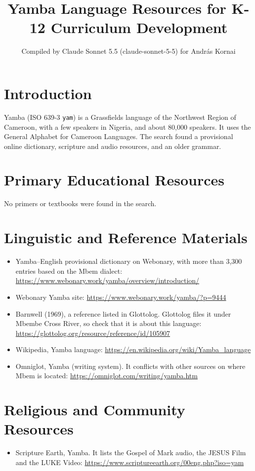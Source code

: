 \documentclass[12pt]{article}
\title{Yamba Language Resources for K-12 Curriculum Development}
\author{Compiled by Claude Sonnet 5.5 (claude-sonnet-5-5) for Andr\'as Kornai}
\date{}
\begin{document}
\maketitle

\section{Introduction}
Yamba (ISO 639-3 \texttt{yam}) is a Grassfields language of the Northwest Region of Cameroon, with a few speakers in Nigeria, and about 80,000 speakers. It uses the General Alphabet for Cameroon Languages. The search found a provisional online dictionary, scripture and audio resources, and an older grammar.

\section{Primary Educational Resources}
No primers or textbooks were found in the search.

\section{Linguistic and Reference Materials}
\begin{itemize}
\item Yamba--English provisional dictionary on Webonary, with more than 3,300 entries based on the Mbem dialect: \url{https://www.webonary.work/yamba/overview/introduction/}
\item Webonary Yamba site: \url{https://www.webonary.work/yamba/?p=9444}
\item Barnwell (1969), a reference listed in Glottolog. Glottolog files it under Mbembe Cross River, so check that it is about this language: \url{https://glottolog.org/resource/reference/id/105907}
\item Wikipedia, Yamba language: \url{https://en.wikipedia.org/wiki/Yamba_language}
\item Omniglot, Yamba (writing system). It conflicts with other sources on where Mbem is located: \url{https://omniglot.com/writing/yamba.htm}
\end{itemize}

\section{Religious and Community Resources}
\begin{itemize}
\item Scripture Earth, Yamba. It lists the Gospel of Mark audio, the JESUS Film and the LUKE Video: \url{https://www.scriptureearth.org/00eng.php?iso=yam}
\end{itemize}
\end{document}
